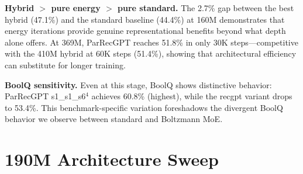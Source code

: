 \documentclass[oneside]{article}
\begin{document}
\textbf{Hybrid $>$ pure energy $>$ pure standard.} The 2.7\% gap between the best hybrid (47.1\%) and the standard baseline (44.4\%) at 160M demonstrates that energy iterations provide genuine representational benefits beyond what depth alone offers. At 369M, ParRecGPT reaches 51.8\% in only 30K steps---competitive with the 410M hybrid at 60K steps (51.4\%), showing that architectural efficiency can substitute for longer training.

\textbf{BoolQ sensitivity.} Even at this stage, BoolQ shows distinctive behavior: ParRecGPT s1\_s1\_s6$^4$ achieves 60.8\% (highest), while the recgpt variant drops to 53.4\%. This benchmark-specific variation foreshadows the divergent BoolQ behavior we observe between standard and Boltzmann MoE.


\section{190M Architecture Sweep}
\label{sec:190m}
\end{document}
